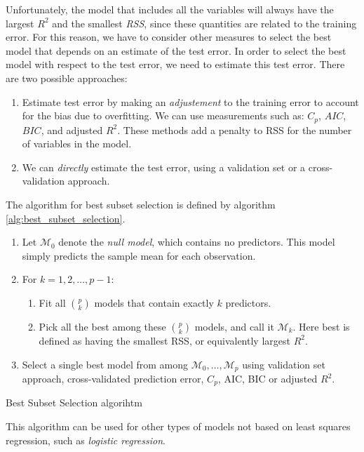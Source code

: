 Unfortunately, the model that includes all the variables will always have the largest $R^2$ and the smallest \textit{RSS}, since these quantities are related to the training error. For this reason, we have to consider other measures to select the best model that depends on an estimate of the test error.
In order to select the best model with respect to the test error, we need to estimate this test error. There are two possible approaches:
\begin{enumerate}
    \item Estimate test error by making an \textit{adjustement} to the training error to account for the bias due to overfitting. We can use measurements such as: $C_p$, $AIC$, $BIC$, and adjusted $R^2$. These methods add a penalty to RSS for the number of variables in the model.
    \item We can \textit{directly} estimate the test error, using a validation set or a cross-validation approach.
\end{enumerate}


The algorithm for best subset selection is defined by algorithm \ref{alg:best_subset_selection}.
\begin{algorithm}[h]
    \begin{enumerate}
        \item Let $\mathcal{M}_0$ denote the \textit{null model}, which contains no predictors. This model simply predicts the sample mean for each observation.
        \item For $k = 1,2,\dots, p-1$:
        \begin{enumerate}
            \item Fit all $\binom{p}{k}$ models that contain exactly $k$ predictors.
            \item Pick all the best among these $\binom{p}{k}$ models, and call it $\mathcal M_{k}$. Here best is defined as having the smallest RSS, or equivalently largest $R^2$.
        \end{enumerate}
        \item Select a single best model from among $\mathcal{M}_0, \dots, \mathcal{M}_p$ using validation set approach, cross-validated prediction error, $C_p$, AIC, BIC or adjusted $R^2$.
    \end{enumerate}
    \label{alg:best_subset_selection}
    \caption{Best Subset Selection algorihtm}
\end{algorithm}

This algorithm can be used for other types of models not based on least squares regression, such as \textit{logistic regression}.

